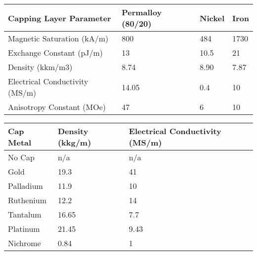 \documentclass[12]{article}
\begin{document}
\begin{table}[H]
\centering
\begin{tabular}{l|l|l|l}
Capping Layer Parameter                      & Permalloy (80/20) & Nickel                    & Iron                       \\ \hline
Magnetic Saturation (kA/m)          & 800                  & 484 & 1730 \\
Exchange Constant (pJ/m)           &  13                 & 10.5                      & 21                         \\
Density (kkm/m3) &   8.74                & 8.90                      & 7.87                       \\
Electrical Conductivity (MS/m)     &       14.05            & 0.4                       & 10         \\
Anisotropy Constant (MOe) & 47 & 6 & 10 \\
               
\end{tabular}
\end{table}

\begin{table}[H]
\centering
\begin{tabular}{l|l|l}
Cap Metal & Density (kkg/m) & Electrical Conductivity (MS/m) \\ \hline
No Cap    & n/a             & n/a                        \\
Gold      & 19.3            & 41                         \\
Palladium & 11.9            & 10                         \\
Ruthenium & 12.2            & 14                         \\
Tantalum  & 16.65           & 7.7                        \\
Platinum  & 21.45           & 9.43                       \\
Nichrome  & 0.84            & 1                         
\end{tabular}
\end{table}


\cleardoublepage
\end{document}
